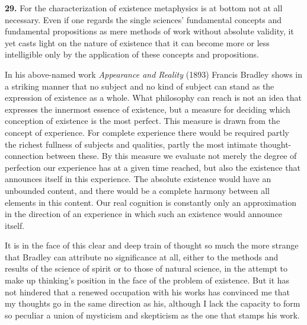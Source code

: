 \documentclass[12pt]{book}
\newcommand{\hnum}[1]{\textbf{#1.}\enspace}
\newcommand{\opage}[1]{\marginnote{\footnotesize\textit{[#1]}}}
\begin{document}
\hnum{29} For the characterization of existence metaphysics is at bottom not at all necessary. Even if one
regards the single sciences' fundamental concepts and fundamental propositions as mere methods of work without
absolute validity, it yet casts light on the nature of existence that it can become more or less intelligible only
by the application of these concepts and propositions.

In his above-named work \textit{Appearance and Reality} (1893) Francis Bradley shows in a striking manner that no
subject and no kind of subject can stand as the expression of existence as a whole. What philosophy can reach is
not an idea that expresses the innermost essence of existence, but a measure for deciding which conception of
existence is the most perfect. This measure is drawn from the concept of experience. For complete experience there
would be required partly the richest fullness of subjects and qualities, partly the most intimate thought-connection
between these. By this measure we evaluate not merely the degree of perfection our experience has at a given time
reached, but also the existence that announces itself in this experience. The absolute existence would have an
unbounded content, and there would be a complete harmony between all elements in this content. Our real cognition is
constantly only an approximation in the direction of an experience in which such an existence would announce itself.

It is in the face of this clear and deep train of thought so \opage{96}much the more strange that Bradley can attribute no
significance at all, either to the methods and results of the science of spirit or to those of natural science, in
the attempt to make up thinking's position in the face of the problem of existence. But it has not hindered that a
renewed occupation with his works has convinced me that my thoughts go in the same direction as his, although I lack
the capacity to form so peculiar a union of mysticism and skepticism as the one that stamps his work.
\end{document}

